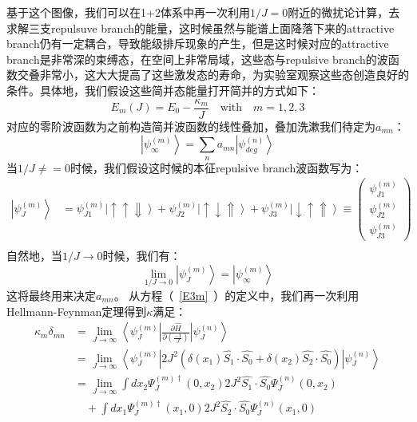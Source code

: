 基于这个图像，我们可以在1+2体系中再一次利用$1/J=0$附近的微扰论计算，去求解三支repulsuve branch的能量，这时候虽然与能谱上面降落下来的attractive branch仍有一定耦合，导致能级排斥现象的产生，但是这时候对应的attractive branch是非常深的束缚态，在空间上非常局域，这些态与repulsive branch的波函数交叠非常小，这大大提高了这些激发态的寿命，为实验室观察这些态创造良好的条件。具体地，我们假设这些简并态能量打开简并的方式如下：
\begin{equation}
    E_m(J) = E_0 - \frac{\kappa_m }{J} \quad \text{with}  \quad m =1,2,3  \label{E3m}
\end{equation}
对应的零阶波函数为之前构造简并波函数的线性叠加，叠加洗漱我们待定为$a_{mn}$：
    \begin{equation}
        \left|\psi^{(m)}_{\infty} \right> = \sum_n a_{mn} \left|\psi^{(n)}_{deg}\right>
    \end{equation}
当$1/J\neq=0$时候，我们假设这时候的本征repulsive branch波函数写为：
    \begin{equation}
        \begin{split}
            \left|\psi^{(m)}_J\right> &=  \psi^{(m)}_{J1}\left|\uparrow \uparrow \Downarrow \right> + \psi^{(m)}_{J2} \left|\uparrow \downarrow \Uparrow \right>  +\psi^{(m)}_{J3} \left|\downarrow \uparrow \Uparrow \right> \equiv\left(
            \begin{array}{c}
                \psi_{J1}^{(m)} \\
                \psi_{J2}^{(m)}\\
                \psi_{J3}^{(m)}
            \end{array}
            \right)\\
        \end{split} \label{eq2}
    \end{equation} 
自然地，当$1/J\to0$时候，我们有：
\begin{equation}\label{infcond}
    \lim_{1/J\to0} \left|\psi^{(m)}_J\right>  = \left|\psi^{(m)}_{\infty} \right>
\end{equation}
这将最终用来决定$a_{mn}$。
从方程（~\ref{E3m}~）的定义中，我们再一次利用Hellmann-Feynman定理得到$\kappa$满足：
    \begin{equation}
        \begin{split}
            \kappa_m \delta_{mn} &= \lim_{J\to \infty} \left<\psi^{(m)}_J\right| \frac{\partial\hat{H}}{\partial(\frac{-1}{J})} \left|\psi^{(n)}_{J}\right>\\
                &= \lim_{J\to \infty} \left<\psi^{(m)}_J\right| 2J^2(\delta(x_1)\hat{S_1}\cdot \hat{S_0}+\delta(x_2)\hat{S_2}\cdot \hat{S_0}) \left|\psi^{(n)}_{J}\right>\\
                &= \lim_{J\to \infty} \int  dx_2 \Psi^{(m)\dagger}_J(0,x_2) 2J^2 \hat{S_1}\cdot \hat{S_0} \Psi^{(n)}_J(0,x_2) \\
                &\quad + \int dx_1 \Psi^{(m)\dagger}_J(x_1,0) 2J^2 \hat{S_2}\cdot \hat{S_0} \Psi^{(n)}_J(x_1,0) \\
        \end{split} \label{kappam}
    \end{equation}
